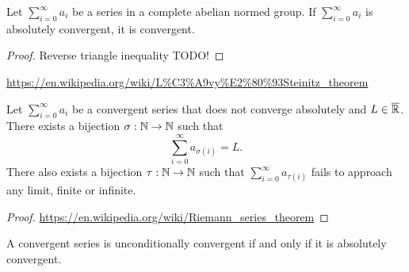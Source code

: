 \begin{proposition}
Let $\sum_{i=0}^\infty a_i$ be a series in a complete abelian normed group. If $\sum_{i=0}^\infty a_i$ is absolutely convergent, it is convergent.
\end{proposition}
\begin{proof}
Reverse triangle inequality TODO!
\end{proof}

\begin{proposition}
\url{https://en.wikipedia.org/wiki/L%C3%A9vy%E2%80%93Steinitz_theorem}
\end{proposition}
\begin{corollary}
Let $\sum_{i=0}^\infty a_i$ be a convergent series that does not converge absolutely and $L\in \overline{\mathbb{R}}$. There exists a bijection $\sigma:\mathbb{N}\to\mathbb{N}$ such that
\[ \sum_{i=0}^\infty a_{\sigma(i)} = L. \]
There also exists a bijection $\tau:\mathbb{N}\to\mathbb{N}$ such that $\sum_{i=0}^\infty a_{\tau(i)}$ fails to approach any limit, finite or infinite.
\end{corollary}
\begin{proof}
\url{https://en.wikipedia.org/wiki/Riemann_series_theorem}
\end{proof}
\begin{corollary}
A convergent series is unconditionally convergent \textup{if and only if} it is absolutely convergent.
\end{corollary}



